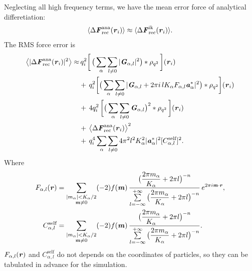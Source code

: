 \documentclass[aps,pre,preprint]{revtex4}
\renewcommand{\v}[1]{\textbf{\textit{#1}}}
\begin{document}
Neglecting all high frequency terms, we have the mean error force of
analytical differetiation:
\begin{align}\label{eqn:tmp31}
  \langle \Delta\v F_{\textrm{rec}}^{\textrm{ana}}(\v r_i)\rangle
  \approx
  \langle \Delta\v F_{\textrm{rec}}^{\textrm{ik}}(\v r_i)\rangle.
\end{align}
The RMS force error is 
\begin{align}\nonumber
  \big\langle
  \vert \Delta\v F_{\textrm{rec}}^{\textrm{ana}}(\v r_i)\vert^2
  \big\rangle
  \approx&\,
  q_i^2
  \bigg[\,
  \big(
  \sum_{\alpha} \sum_{l\neq 0}
  \vert \v G_{\alpha,l}\vert^2
  \big)
  \ast \rho_{q^2}
  \,\bigg] (\v r_i) \\\nonumber
  & +\,
  q_i^2
  \bigg[
  \big(
  \sum_{\alpha}\sum_{l\neq 0}
  \vert
  \v G_{\alpha,l} + 2\pi i\,l K_\alpha F_{\alpha,l} \v a_\alpha^\ast\vert^2
  \big)
  \ast \rho_{q^2}
  \bigg]
  (\v r_i) \\ \nonumber
  & +\,
  4q_i^2\,
  \bigg[
  \big(
  \sum_{\alpha} \sum_{l\neq 0}  
  \v G_{\alpha,l}
  \big)^2
  \ast \rho_{q^2}\,
  \bigg] (\v r_i) \\\nonumber
  & +\,
  \big\langle \Delta\v F_{\textrm{rec}}^{\textrm{ana}}(\v r_i)\big\rangle ^2\\
  &+\,
  q_i^4 \sum_{\alpha}\sum_{l\neq 0}
  4\pi^2l^2K_\alpha^2\vert\v a_{\alpha}^\ast\vert^2[C_{\alpha,l}^{\textrm{self}}]^2 .
\end{align}
Where
\begin{align}
  F_{\alpha,l} (\v r)
  &=
  \sum_{
    \begin{subarray}{c}
      \vert m_{\alpha}\vert < K_\alpha/2\\
      \v m\neq 0
    \end{subarray}}
  (-2)f(\v m)\,
  \frac
  {\big(\dfrac{2\pi m_\alpha}{K_\alpha} + 2\pi l\big)^{-n}}
  {\sum\limits_{l=-\infty}^{+\infty}
    \big(\dfrac{2\pi m_\alpha}{K_\alpha} + 2\pi l\big)^{-n}}\,
  e^{2\pi i\v m\cdot \v r},\\
  C_{\alpha,l}^{\textrm{self}}
  &= 
  \sum_{
    \begin{subarray}{c}
      \vert m_{\alpha}\vert < K_\alpha/2\\
      \v m\neq 0
    \end{subarray}}
  (-2)f(\v m)\,
  \frac
  {\big(\dfrac{2\pi m_\alpha}{K_\alpha} + 2\pi l\big)^{-n}}
  {\sum\limits_{l=-\infty}^{+\infty}
    \big(\dfrac{2\pi m_\alpha}{K_\alpha} + 2\pi l\big)^{-n}}.
\end{align}
$F_{\alpha,l} (\v r)$ and $C_{\alpha,l}^{\textrm{self}}$ 
do not depends on the coordinates of particles,
so they can be tabulated in advance for the simulation.
\end{document}
